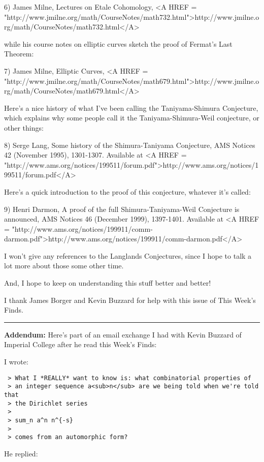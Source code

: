 6) James Milne, Lectures on Etale Cohomology,
<A HREF = "http://www.jmilne.org/math/CourseNotes/math732.html">http://www.jmilne.org/math/CourseNotes/math732.html</A>

while his course notes on elliptic curves sketch the proof of Fermat's Last 
Theorem:

7) James Milne, Elliptic Curves, 
<A HREF = "http://www.jmilne.org/math/CourseNotes/math679.html">http://www.jmilne.org/math/CourseNotes/math679.html</A>

Here's a nice history of what I've been calling the Taniyama-Shimura
Conjecture, which explains why some people call it the Taniyama-Shimura-Weil 
conjecture, or other things:

8) Serge Lang, Some history of the Shimura-Taniyama Conjecture,
AMS Notices 42 (November 1995), 1301-1307.  Available at
<A HREF = "http://www.ams.org/notices/199511/forum.pdf">http://www.ams.org/notices/199511/forum.pdf</A>

Here's a quick introduction to the proof of this conjecture, whatever 
it's called:

9) Henri Darmon, A proof of the full Shimura-Taniyama-Weil Conjecture
is announced, AMS Notices 46 (December 1999), 1397-1401.  Available
at <A HREF = "http://www.ams.org/notices/199911/comm-darmon.pdf">http://www.ams.org/notices/199911/comm-darmon.pdf</A>

I won't give any references to the Langlands Conjectures, since
I hope to talk a lot more about those some other time.

And, I hope to keep on understanding this stuff better and better!  

I thank James Borger and Kevin Buzzard for help with this issue of
This Week's Finds.

\par\noindent\rule{\textwidth}{0.4pt}
\textbf{Addendum:} Here's part of an email exchange I had with Kevin Buzzard
of Imperial College after he read this Week's Finds:

I wrote:

\begin{verbatim}
 > What I *REALLY* want to know is: what combinatorial properties of
 > an integer sequence a<sub>n</sub> are we being told when we're told that
 > the Dirichlet series
 >
 > sum_n a^n n^{-s}
 >
 > comes from an automorphic form?
\end{verbatim}
    
He replied:




